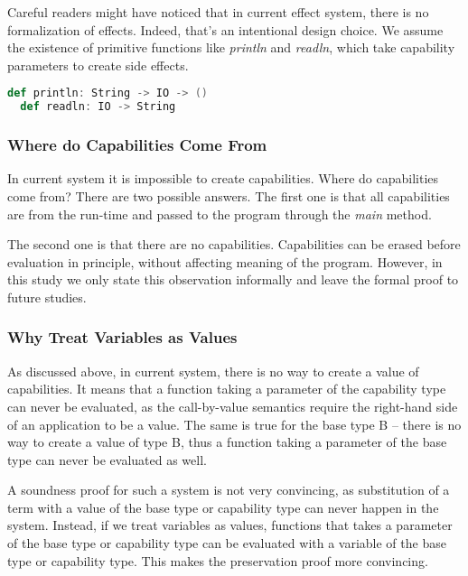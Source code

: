 Careful readers might have noticed that in current effect system,
there is no formalization of effects. Indeed, that's an intentional
design choice. We assume the existence of primitive functions like
\emph{println} and \emph{readln}, which take capability parameters to
create side effects.

\begin{lstlisting}[language=Scala]
  def println: String -> IO -> ()
  def readln: IO -> String
\end{lstlisting}



\subsubsection{Where do Capabilities Come From}

In current system it is impossible to create capabilities. Where do
capabilities come from?  There are two possible answers. The first one
is that all capabilities are from the run-time and passed to the
program through the \emph{main} method.

The second one is that there are no capabilities. Capabilities can be
erased before evaluation in principle, without affecting meaning of
the program. However, in this study we only state this observation
informally and leave the formal proof to future studies.

\subsubsection{Why Treat Variables as Values}

As discussed above, in current system, there is no way to create a
value of capabilities. It means that a function taking a parameter of
the capability type can never be evaluated, as the call-by-value
semantics require the right-hand side of an application to be a
value. The same is true for the base type B -- there is no way to
create a value of type B, thus a function taking a parameter of the
base type can never be evaluated as well.

A soundness proof for such a system is not very convincing, as
substitution of a term with a value of the base type or capability
type can never happen in the system. Instead, if we treat variables as
values, functions that takes a parameter of the base type or
capability type can be evaluated with a variable of the base type or
capability type. This makes the preservation proof more convincing.

